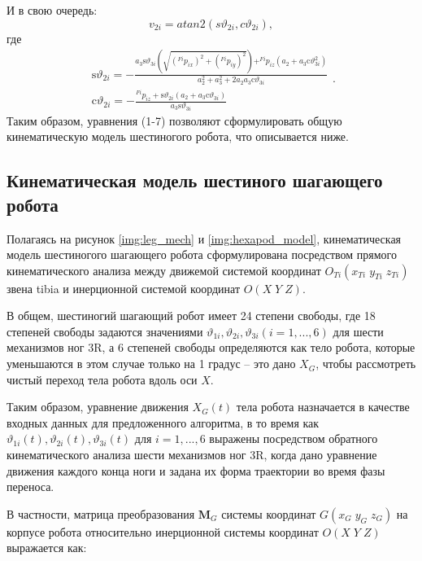 И в свою очередь:
\begin{equation}
	v_{2i}=atan2(s\vartheta_{2i}, c\vartheta_{2i}),
\end{equation}
где
\begin{equation}
\begin{array}{l}
\mathrm{s} \vartheta_{2 i}=-\frac{a_{3} \mathrm{s} \vartheta_{3 i}(\sqrt{\left(^{F i} p_{i x}\right)^{2}+\left(^{F i} p_{i y}\right)^{2}})+^{F i} p_{i z}\left(a_{2}+a_{3} \mathrm{c} \vartheta_{3 i}^{2}\right)}{a_{2}^{2}+a_{3}^{2}+2 a_{2} a_{3} \mathrm{c} \vartheta_{3 i}} \\
\mathrm{c} \vartheta_{2 i}=-\frac{^{F i}p_{i z}+\mathrm{s} \vartheta_{2 i}\left(a_{2}+a_{3} \mathrm{c} \vartheta_{3 i}\right)}{a_{3} \mathrm{s} \vartheta_{3 i}}
\end{array}.
\end{equation}
Таким образом, уравнения (1-7) позволяют сформулировать общую кинематическую модель шестиногого робота, что описывается ниже.

\subsection{Кинематическая модель шестиного шагающего робота}

Полагаясь на рисунок \ref{img:leg_mech} и \ref{img:hexapod_model}, кинематическая модель шестиногого шагающего робота сформулирована посредством прямого кинематического анализа между движемой системой координат $O_{Ti}(x_{Ti}\;y_{Ti}\;z_ {Ti})$ звена tibia и инерционной системой координат $O(X\;Y\;Z)$. 

В общем, шестиногий шагающий робот имеет 24 степени свободы, где 18 степеней свободы задаются значениями $\vartheta_{1i},\vartheta_{2i},\vartheta_{3i}(i=1,...,6)$ для шести механизмов ног 3R, а 6 степеней свободы определяются как тело робота, которые уменьшаются в этом случае только на 1 градус – это дано $X_G$, чтобы рассмотреть чистый переход тела робота вдоль оси $X$.

Таким образом, уравнение движения $X_G(t)$ тела робота назначается в качестве входных данных для предложенного алгоритма, в то время как $\vartheta_{1i}(t), \vartheta_{2i}(t), \vartheta_{3i}(t)$ для $i=1,...,6$ выражены посредством обратного кинематического анализа шести механизмов ног 3R, когда дано уравнение движения каждого конца ноги и задана их форма траектории во время фазы переноса.

В частности, матрица преобразования $\mathbf{M}_G$ системы координат $G(x_G\;y_G\;z_G)$ на корпусе робота относительно инерционной системы координат $O(X\;Y\;Z)$ выражается как:

